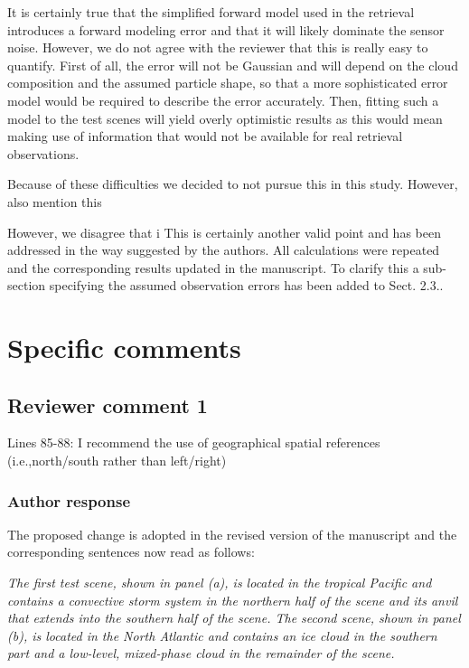 \documentclass[11pt]{scrartcl}
\begin{document}
\begin{itemize}
It is certainly true that the simplified forward model used in the retrieval
introduces a forward modeling error and that it will likely dominate the sensor
noise. However, we do not agree with the reviewer that this is really easy to
quantify. First of all, the error will not be Gaussian and will depend on the
cloud composition and the assumed particle shape, so that a more sophisticated
error model would be required to describe the error accurately. Then, fitting
such a model to the test scenes will yield overly optimistic results as this
would mean making use of information that would not be available for real
retrieval observations.

Because of these difficulties we decided to not pursue this in this study.
However, also mention this 


However, we disagree that i
This is certainly another valid point and has been addressed in the way suggested
by the authors. All calculations were repeated and the corresponding results
updated in the manuscript. To clarify this a sub-section specifying the assumed observation
errors has been added to Sect. 2.3..
\vspace{1em}


\section{Specific comments}

\subsection*{Reviewer comment 1}
Lines  85-88:   I  recommend  the  use  of  geographical  spatial  references  (i.e.,north/south rather than left/right)

\subsubsection*{Author response}

The proposed change is adopted in the revised version of the manuscript and the corresponding
sentences now read as follows:

\textit{
The first test scene, shown in panel (a), is located in the
tropical Pacific and contains a convective storm system in the northern half of
the scene and its anvil that extends into the southern half of the scene. The
second scene, shown in panel (b), is located in the North Atlantic and contains
an ice cloud in the southern part and a low-level, mixed-phase cloud in the
remainder of the scene.
}




\end{itemize}
\end{document}
